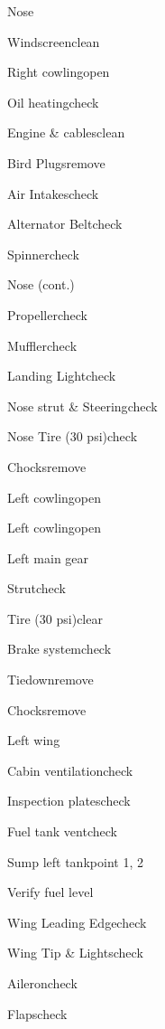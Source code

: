 \begin{multicols}{2}
\begin{checklist}{Nose}
  \item{Windscreen}{clean}
  \item{Right cowling}{open}
  \item{Oil heating}{check}
  \item{Engine \& cables}{clean}
  \item{Bird Plugs}{remove}
  \item{Air Intakes}{check}
  \item{Alternator Belt}{check}
  \item{Spinner}{check}
\end{checklist}

\begin{checklist}{Nose (cont.)}
  \item{Propeller}{check}
  \item{Muffler}{check}
  \item{Landing Light}{check}
  \item{Nose strut \& Steering}{check}
  \item{Nose Tire (30 psi)}{check}
  \item{Chocks}{remove}
  \item{Left cowling}{open}
  \item{Left cowling}{open}
\end{checklist}

\begin{checklist}{Left main gear}
  \item{Strut}{check}
  \item{Tire (30 psi)}{clear}
  \item{Brake system}{check}
  \item{Tiedown}{remove}
  \item{Chocks}{remove}
\end{checklist}

\begin{checklist}{Left wing}
  \item{Cabin ventilation}{check}
  \item{Inspection plates}{check}
  \item{Fuel tank vent}{check}
  \item{Sump left tank}{point 1, 2}
  \item{Verify fuel level}{}
  \item{Wing Leading Edge}{check}
  \item{Wing Tip \& Lights}{check}
  \item{Aileron}{check}
  \item{Flaps}{check}
\end{checklist}


\end{multicols}
